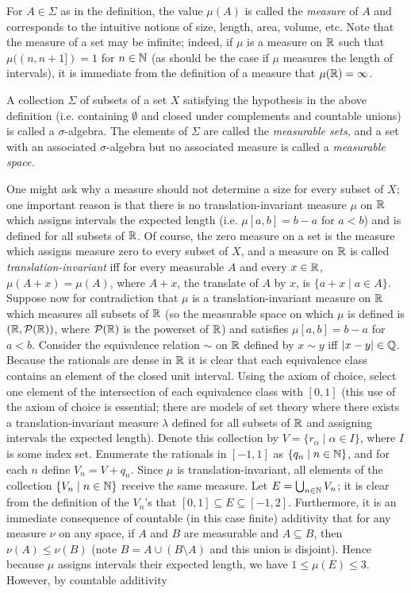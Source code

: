 \documentclass{amsart}
\theoremstyle{definition}
\theoremstyle{remark}
\newcommand{\bldset}[2]{\{{#1}\mid{#2}\}}
\begin{document}
For $A \in \Sigma$ as in the definition, the value $\mu(A)$ is called the {\em measure} of $A$ and corresponds to the intuitive notions of size, length, area, volume, etc. Note that the measure of a set may be infinite; indeed, if $\mu$ is a measure on $\mathbb{R}$ such that $\mu((n, n+1]) = 1$ for $n \in \mathbb{N}$ (as should be the case if $\mu$ measures the length of intervals), it is immediate from the definition of a measure that $\mu(\mathbb{R}) = \infty$.

A collection $\Sigma$ of subsets of a set $X$ satisfying the hypothesis in the above definition (i.e. containing $\emptyset$ and closed under complements and countable unions) is called a $\sigma$-algebra. The elements of $\Sigma$ are called the {\em measurable sets,} and a set with an associated $\sigma$-algebra but no associated measure is called a {\em measurable space.} 

One might ask why a measure should not determine a size for every subset of $X$; one important reason is that there is no translation-invariant measure $\mu$ on $\mathbb{R}$ which assigns intervals the expected length (i.e. $\mu [a,b] = b - a$ for $a < b$) and is defined for all subsets of $\mathbb{R}$. Of course, the zero measure on a set is the measure which assigns measure zero to every subset of $X$, and a measure on $\mathbb{R}$ is called {\em translation-invariant} iff for every measurable $A$ and every $x \in \mathbb{R}$, $\mu(A + x) = \mu(A)$, where $A + x$, the translate of $A$ by $x$, is $\bldset{a + x}{a \in A}$. Suppose now for contradiction that $\mu$ is a translation-invariant measure on $\mathbb{R}$ which measures all subsets of $\mathbb{R}$ (so the measurable space on which $\mu$ is defined is $(\mathbb{R}, \mathcal P(\mathbb{R}))$, where $\mathcal P(\mathbb{R})$ is the powerset of $\mathbb{R}$) and satisfies $\mu [a,b] = b - a$ for $a < b$. Consider the equivalence relation $\sim$ on $\mathbb{R}$ defined by $x \sim y$ iff $|x - y| \in \mathbb{Q}$. Because the rationals are dense in $\mathbb{R}$ it is clear that each equivalence class contains an element of the closed unit interval. Using the axiom of choice, select one element of the intersection of each equivalence class with $[0,1]$ (this use of the axiom of choice is essential; there are models of set theory where there exists a translation-invariant measure $\lambda$ defined for all subsets of $\mathbb{R}$ and assigning intervals the expected length). Denote this collection by $V = \bldset{r_\alpha}{\alpha \in I}$, where $I$ is some index set. Enumerate the rationals in $[-1,1]$ as $\bldset{q_n}{n \in \N}$, and for each $n$ define $V_n = V + q_n$. Since $\mu$ is translation-invariant, all elements of the collection $\bldset{V_n}{n \in \N}$ receive the same measure. Let $E = \bigcup_{n \in \mathbb{N}} V_n$; it is clear from the definition of the $V_n$'s that $[0,1] \subseteq E \subseteq [-1,2]$. Furthermore, it is an immediate consequence of countable (in this case finite) additivity that for any measure $\nu$ on any space, if $A$ and $B$ are measurable and $A \subseteq B$, then $\nu(A) \le \nu(B)$ (note $B = A \cup (B \setminus A)$ and this union is disjoint). Hence because $\mu$ assigns intervals their expected length, we have $1 \le \mu(E) \le 3$. However, by countable additivity
\end{document}
